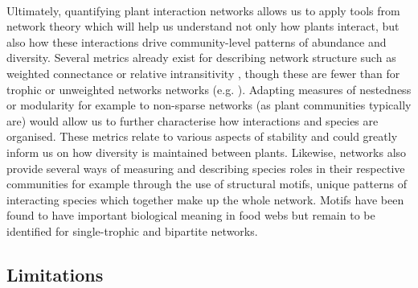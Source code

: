\documentclass[a4,12pt]{article}
\begin{document}
        \paragraph{}
        Ultimately, quantifying plant interaction networks allows us to apply tools from network theory which will help us understand not only how plants interact, but also how these interactions drive community-level patterns of abundance and diversity. Several metrics already exist for describing network structure such as weighted connectance \parencite{Ulanowicz1991} or relative intransitivity \parencite{Laird2006a}, though these are fewer than for trophic or unweighted networks networks (e.g. \cite{Bersier2002, Delmas2019}). Adapting measures of nestedness or modularity for example to non-sparse networks (as plant communities typically are) would allow us to further characterise how interactions and species are organised. These metrics relate to various aspects of stability and could greatly inform us on how diversity is maintained between plants. Likewise, networks also provide several ways of measuring and describing species roles in their respective communities \parencite{Cirtwill2018a} for example through the use of structural motifs, unique patterns of interacting species which together make up the whole network. Motifs have been found to have important biological meaning in food webs \parencite{Bascompte2005a} but remain to be identified for single-trophic and bipartite networks. 

     

   \subsection{Limitations}
        
\end{document}
